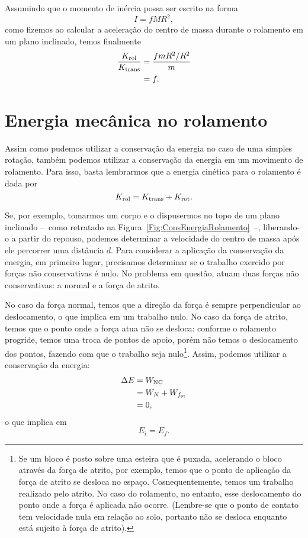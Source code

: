 Assumindo que o momento de inércia possa ser escrito na forma
\begin{equation}
    I = f MR^2,
\end{equation}
%
como fizemos ao calcular a aceleração do centro de massa durante o rolamento em um plano inclinado, temos finalmente
\begin{align}
    \frac{K_{\rm{rol}}}{K_{\rm{trans}}} &= \frac{f mR^2 /R^2}{m} \\
    &= f.
\end{align}

\section{Energia mecânica no rolamento}

Assim como pudemos utilizar a conservação da energia no caso de uma simples rotação, também podemos utilizar a conservação da energia em um movimento de rolamento. Para isso, basta lembrarmos que a energia cinética para o rolamento é dada por
\begin{equation}
    K_{\rm{rol}} = K_{\rm{trans}} + K_{\rm{rot}}.
\end{equation}

Se, por exemplo, tomarmos um corpo e o dispusermos no topo de um plano inclinado --~como retratado na Figura~\ref{Fig:ConsEnergiaRolamento}~--, liberando-o a partir do repouso, podemos determinar a velocidade do centro de massa após ele percorrer uma distância $d$. Para considerar a aplicação da conservação da energia, em primeiro lugar, precisamos determinar se o trabalho exercido por forças não conservativas é nulo. No problema em questâo, atuam duas forças não conservativas: a normal e a força de atrito.

No caso da força normal, temos que a direção da força é sempre perpendicular ao deslocamento, o que implica em um trabalho nulo. No caso da força de atrito, temos que o ponto onde a força atua não se desloca: conforme o rolamento progride, temos uma troca de pontos de apoio, porém não temos o deslocamento dos pontos, fazendo com que o trabalho seja nulo\footnote{Se um bloco é posto sobre uma esteira que é puxada, acelerando o bloco através da força de atrito, por exemplo, temos que o ponto de aplicação da força de atrito se desloca no espaço. Cosnequentemente, temos um trabalho realizado pelo atrito. No caso do rolamento, no entanto, esse deslocamento do ponto onde a força é aplicada não ocorre. (Lembre-se que o ponto de contato tem velocidade nula em relação ao solo, portanto não se desloca enquanto está sujeito à força de atrito).}. Assim, podemos utilizar a conservação da energia:
\begin{align}
    \Delta E &= W_{\rm{NC}} \\
    &= W_N + W_{f_{\rm{at}}} \\
    &=0,
\end{align}
%
o que implica em
\begin{equation}
    E_i = E_f.
\end{equation}

